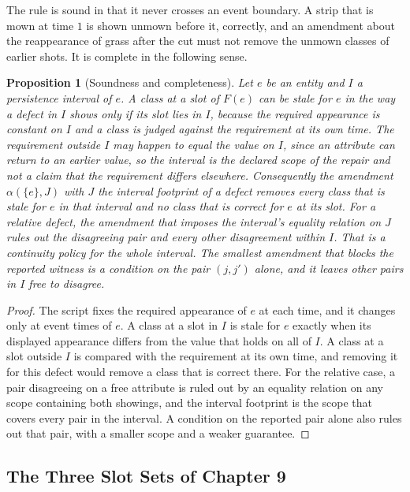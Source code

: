 \documentclass[11pt,twoside,openright]{book}
\theoremstyle{plain}
\newtheorem{proposition}[theorem]{Proposition}
\theoremstyle{definition}
\theoremstyle{remark}
\begin{document}
The rule is sound in that it never crosses an event boundary. A strip that is mown at time $1$ is shown unmown before it, correctly, and an amendment about the reappearance of grass after the cut must not remove the unmown classes of earlier shots. It is complete in the following sense.

\begin{proposition}[Soundness and completeness]\label{prop:sound}
Let $e$ be an entity and $I$ a persistence interval of $e$. A class at a slot of $F(e)$ can be stale for $e$ in the way a defect in $I$ shows only if its slot lies in $I$, because the required appearance is constant on $I$ and a class is judged against the requirement at its own time. The requirement outside $I$ may happen to equal the value on $I$, since an attribute can return to an earlier value, so the interval is the declared scope of the repair and not a claim that the requirement differs elsewhere. Consequently the amendment $\alpha(\{e\},J)$ with $J$ the interval footprint of a defect removes every class that is stale for $e$ in that interval and no class that is correct for $e$ at its slot. For a relative defect, the amendment that imposes the interval's equality relation on $J$ rules out the disagreeing pair and every other disagreement within $I$. That is a continuity policy for the whole interval. The smallest amendment that blocks the reported witness is a condition on the pair $(j,j')$ alone, and it leaves other pairs in $I$ free to disagree.
\end{proposition}

\begin{proof}
The script fixes the required appearance of $e$ at each time, and it changes only at event times of $e$. A class at a slot in $I$ is stale for $e$ exactly when its displayed appearance differs from the value that holds on all of $I$. A class at a slot outside $I$ is compared with the requirement at its own time, and removing it for this defect would remove a class that is correct there. For the relative case, a pair disagreeing on a free attribute is ruled out by an equality relation on any scope containing both showings, and the interval footprint is the scope that covers every pair in the interval. A condition on the reported pair alone also rules out that pair, with a smaller scope and a weaker guarantee.
\end{proof}

\subsection{The Three Slot Sets of Chapter 9}
\end{document}
